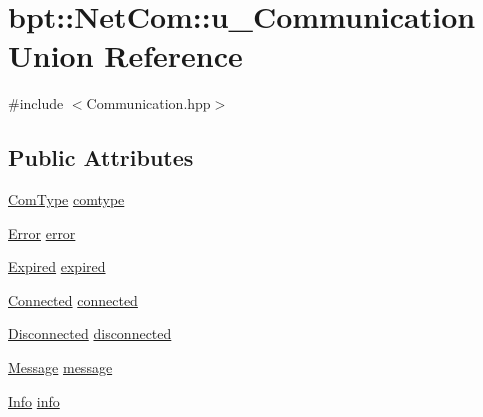 \hypertarget{unionbpt_1_1_net_com_1_1u___communication}{\section{bpt\-:\-:Net\-Com\-:\-:u\-\_\-\-Communication Union Reference}
\label{unionbpt_1_1_net_com_1_1u___communication}
}


{\ttfamily \#include $<$Communication.\-hpp$>$}

\subsection*{Public Attributes}
\begin{DoxyCompactItemize}
\item 
\hyperlink{namespacebpt_1_1_net_com_a73b47b2b099bf7d28997dc72c921212c}{Com\-Type} \hyperlink{unionbpt_1_1_net_com_1_1u___communication_a6e980e9d4d15c9fe3646db559c5b2eb0}{comtype}
\item 
\hyperlink{namespacebpt_1_1_net_com_ae61d63e0ecc44c7b3a5a9a71df6a3e60}{Error} \hyperlink{unionbpt_1_1_net_com_1_1u___communication_aecb2ee65ad8a2e50e63e3d89ed0638da}{error}
\item 
\hyperlink{namespacebpt_1_1_net_com_a71deac9d5c07a72565490311030b44fe}{Expired} \hyperlink{unionbpt_1_1_net_com_1_1u___communication_af4a62fad004dbfb74937f82de2105030}{expired}
\item 
\hyperlink{namespacebpt_1_1_net_com_a4704a0eb0b7d8aa56b2f17fb7536e61e}{Connected} \hyperlink{unionbpt_1_1_net_com_1_1u___communication_a493a576cb4fc382898481b5c7a5f2110}{connected}
\item 
\hyperlink{namespacebpt_1_1_net_com_a9c3ba50108780e0eb42c6e684de8e39e}{Disconnected} \hyperlink{unionbpt_1_1_net_com_1_1u___communication_a587199f7045ff8fc987cf58d5b14f96f}{disconnected}
\item 
\hyperlink{namespacebpt_1_1_net_com_a7d87de97bd1bd619332891928f53ec33}{Message} \hyperlink{unionbpt_1_1_net_com_1_1u___communication_a731a136641ce8db013431bfe2653eff1}{message}
\item 
\hyperlink{namespacebpt_1_1_net_com_ad2f0a143a2bfc9b23ad2c84f418ee103}{Info} \hyperlink{unionbpt_1_1_net_com_1_1u___communication_af1d91eb90a3f757e08f91dd114559774}{info}
\end{DoxyCompactItemize}



